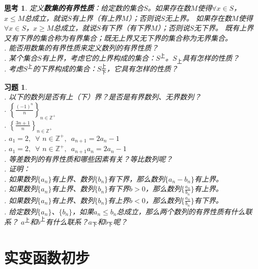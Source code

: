 \documentclass[12pt,UTF8]{ctexbook}
\newtheorem{sk}{思考}[section]
\newtheorem{xt}{习题}[section]
\begin{document}
\begin{sk}
    定义\textbf{数集的有界性质}：给定数的集合$S$。如果存在数$M$使得$\forall x \in S$，$x \leqslant M$总成立，就说$S$有上界（有上界$M$）；否则说$S$无上界。
    如果存在数$M$使得$\forall x \in S$，$x \geqslant M$总成立，就说$S$有下界（有下界$M$）；否则说$S$无下界。
    既有上界又有下界的集合称为有界集合；既无上界又无下界的集合称为无界集合。\\
    . 能否用数集的有界性质来定义数列的有界性质？\\
    . 某个集合$S$有上界，考虑它的上界构成的集合：$S^{\text{上}}$。$S_{\text{上}}$具有怎样的性质？\\
    . 考虑$S^{\text{上}}$的下界构成的集合：$S^{\text{上}}_{\text{下}}$，它具有怎样的性质？
\end{sk}
\begin{xt}
    \mbox{} \\
    . 以下的数列是否有上（下）界？是否是有界数列、无界数列？\\
    . $\left\{\frac{(-1)^n}{n}\right\}_{n\in\mathbb{Z}^+}$ \\
    . $\left\{\frac{3n + 1}{n}\right\}_{n\in\mathbb{Z}^+}$\\
    . $a_1 = 2, \,\,\, \forall \,\, n \in\mathbb{Z}^+, \,\,\, a_{n+1} = 2a_n - 1$\\
    . $a_1 = 2, \,\,\, \forall \,\, n \in\mathbb{Z}^+, \,\,\, a_{n+1}a_n = 2a_n - 1$\\
    . 等差数列的有界性质和哪些因素有关？等比数列呢？\\
    . 证明：\\
    . 如果数列$\{a_n\}$有上界、数列$\{b_n\}$有下界，那么数列$\{a_n - b_n\}$有上界。\\
    . 如果数列$\{a_n\}$有上界、数列$\{b_n\}$有下界$b>0$，那么数列$\{\frac{a_n}{b_n}\}$有上界。\\
    . 如果数列$\{a_n\}$有上界、数列$\{b_n\}$有上界$b<0$，那么数列$\{\frac{a_n}{b_n}\}$有下界。\\
    . 给定数列$\{a_n\}$、$\{b_n\}$，如果$a_n \leqslant b_n$总成立，那么两个数列的有界性质有什么联系？
    $a^{\text{上}}$和$b^{\text{上}}$有什么联系？$a_{\text{下}}$和$b_{\text{下}}$呢？
\end{xt}

\chapter{实变函数初步}
\end{document}
